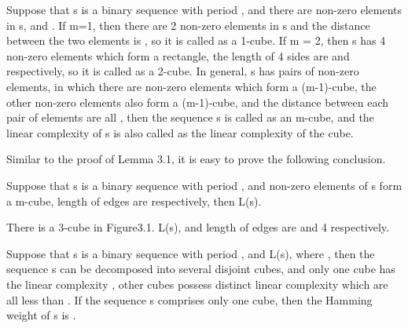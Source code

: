 \documentclass[10pt,conference,twocolumn]{IEEEtran}
\begin{document}
 Suppose that s is a binary sequence
with period , and there are  non-zero elements in s, and
. If m=1, then there are 2 non-zero
elements in s and the distance between the two elements is
, so it is called as a 1-cube. If m = 2, then s has 4
non-zero elements which form a rectangle, the length of 4 sides are
 and  respectively, so it is called as a 2-cube.
In general, s has  pairs of non-zero elements, in which
there are  non-zero elements which form a (m-1)-cube, the
other  non-zero elements also form a (m-1)-cube, and the
distance between each pair of elements are all  , then the
sequence s is called as an m-cube, and the linear complexity of s is
also called as the linear complexity of the cube.

Similar to the proof of Lemma 3.1, it is easy to prove the following
conclusion.

 Suppose that s is a binary sequence
with period , and non-zero elements of s form a m-cube, length
of  edges are   respectively, then L(s).


There is a 3-cube in Figure3.1. L(s), and length of
edges are  and 4 respectively.

 Suppose that s is a binary sequence
with period , and L(s),
where , then the sequence s can be
decomposed into several disjoint cubes, and only one cube has the
linear complexity , other
cubes possess distinct linear complexity which are all less than
. If the sequence s comprises
only one cube, then the Hamming weight of s is .
\end{document}
